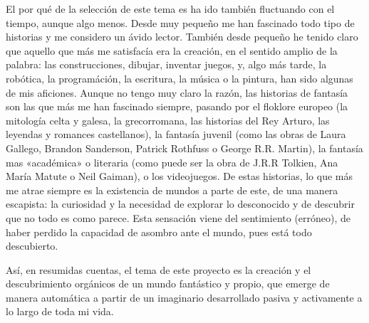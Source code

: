 \documentclass[twoside]{article}
\begin{document}
\begin{multicols}{2}
  El por qué de la selección de este tema es ha ido también fluctuando con
  el tiempo, aunque algo menos. Desde muy pequeño me han fascinado todo
  tipo de historias y me considero un ávido lector. También desde pequeño
  he tenido claro que aquello que más me satisfacía era la creación, en el
  sentido amplio de la palabra: las construcciones, dibujar, inventar
  juegos, y, algo más tarde, la robótica, la programáción, la escritura,
  la música o la pintura, han sido algunas de mis aficiones. Aunque no
  tengo muy claro la razón, las historias de fantasía son las que más me
  han fascinado siempre, pasando por el floklore europeo (la mitología
  celta y galesa, la grecorromana, las historias del Rey Arturo, las
  leyendas y romances castellanos), la fantasía juvenil (como las obras de
  Laura Gallego, Brandon Sanderson, Patrick Rothfuss o George R.R.
  Martin), la fantasía mas «académica» o literaria (como puede ser la
  obra de J.R.R Tolkien, Ana María Matute o Neil Gaiman), o los
  videojuegos. De estas historias, lo que más me atrae siempre es la
  existencia de mundos a parte de este, de una manera escapista: la
  curiosidad y la necesidad de explorar lo desconocido y de descubrir que
  no todo es como parece. Esta sensación viene del sentimiento (erróneo),
  de haber perdido la capacidad de asombro ante el mundo, pues está todo
  descubierto.

  Así, en resumidas cuentas, el tema de este proyecto es la
  creación y el descubrimiento orgánicos de un mundo fantástico y propio,
  que emerge de manera automática a partir de un imaginario desarrollado
  pasiva y activamente a lo largo de toda mi vida.

\end{multicols}

\newpage
\end{document}
